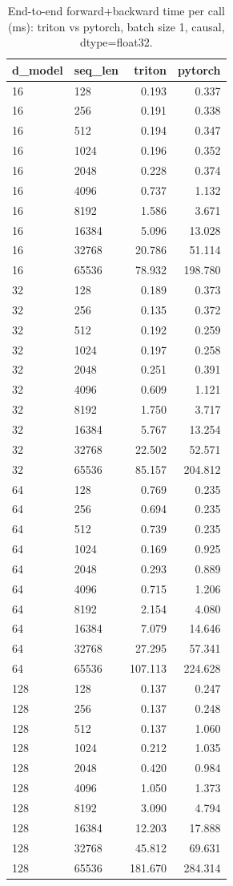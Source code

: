 \begin{table}
\centering
\begin{tabular}{llrr}
\toprule
d\_model & seq\_len & triton & pytorch \\
\midrule
16 & 128 & 0.193 & 0.337 \\
16 & 256 & 0.191 & 0.338 \\
16 & 512 & 0.194 & 0.347 \\
16 & 1024 & 0.196 & 0.352 \\
16 & 2048 & 0.228 & 0.374 \\
16 & 4096 & 0.737 & 1.132 \\
16 & 8192 & 1.586 & 3.671 \\
16 & 16384 & 5.096 & 13.028 \\
16 & 32768 & 20.786 & 51.114 \\
16 & 65536 & 78.932 & 198.780 \\
32 & 128 & 0.189 & 0.373 \\
32 & 256 & 0.135 & 0.372 \\
32 & 512 & 0.192 & 0.259 \\
32 & 1024 & 0.197 & 0.258 \\
32 & 2048 & 0.251 & 0.391 \\
32 & 4096 & 0.609 & 1.121 \\
32 & 8192 & 1.750 & 3.717 \\
32 & 16384 & 5.767 & 13.254 \\
32 & 32768 & 22.502 & 52.571 \\
32 & 65536 & 85.157 & 204.812 \\
64 & 128 & 0.769 & 0.235 \\
64 & 256 & 0.694 & 0.235 \\
64 & 512 & 0.739 & 0.235 \\
64 & 1024 & 0.169 & 0.925 \\
64 & 2048 & 0.293 & 0.889 \\
64 & 4096 & 0.715 & 1.206 \\
64 & 8192 & 2.154 & 4.080 \\
64 & 16384 & 7.079 & 14.646 \\
64 & 32768 & 27.295 & 57.341 \\
64 & 65536 & 107.113 & 224.628 \\
128 & 128 & 0.137 & 0.247 \\
128 & 256 & 0.137 & 0.248 \\
128 & 512 & 0.137 & 1.060 \\
128 & 1024 & 0.212 & 1.035 \\
128 & 2048 & 0.420 & 0.984 \\
128 & 4096 & 1.050 & 1.373 \\
128 & 8192 & 3.090 & 4.794 \\
128 & 16384 & 12.203 & 17.888 \\
128 & 32768 & 45.812 & 69.631 \\
128 & 65536 & 181.670 & 284.314 \\
\bottomrule
\end{tabular}
\caption{End-to-end forward+backward time per call (ms): triton vs pytorch, batch size 1, causal, dtype=float32.}
\label{tab:flash_e2e_compare_float32}
\end{table}

